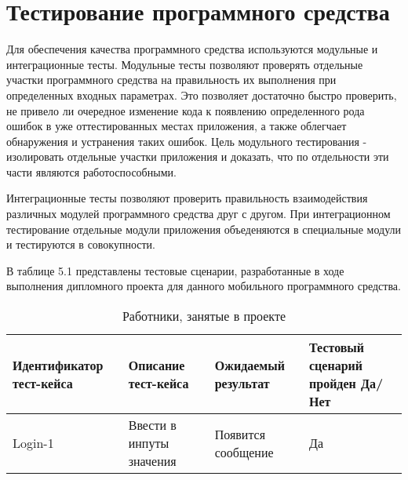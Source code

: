 \section{Тестирование программного средства}
\label{sec:test}

Для обеспечения качества программного средства используются модульные и интеграционные тесты. Модульные тесты позволяют проверять отдельные участки программного средства на правильность их выполнения при определенных входных параметрах. Это позволяет достаточно быстро проверить, не привело ли очередное изменение кода к появлению определенного рода ошибок в уже оттестированных местах приложения, а также облегчает обнаружения и устранения таких ошибок. Цель модульного тестирования - изолировать отдельные участки приложения и доказать, что по отдельности эти части являются работоспособными. 

Интеграционные тесты позволяют проверить правильность взаимодействия различных модулей программного средства друг с другом. При интеграционном тестирование отдельные модули приложения объеденяются в специальные модули и тестируются в совокупности.

В таблице 5.1 представлены тестовые сценарии, разработанные в ходе выполнения дипломного проекта для данного мобильного программного средства.
\begin{table}[ht]
  \caption{Работники, занятые в проекте}
  \label{table:econ:programmers}
  \begin{tabular}{| >{\raggedright}m{} 
                  | >{\raggedright}m{} 
                  | >{\raggedright}m{} 
                  | >{\raggedright\arraybackslash}m{}|}
   \hline
   Идентификатор тест-кейса & Описание тест-кейса & Ожидаемый результат & Тестовый сценарий пройден Да/Нет \\
   \hline
   Login-1 & Ввести в инпуты значения & Появится сообщение & Да \\
   \hline
  \end{tabular}
\end{table}